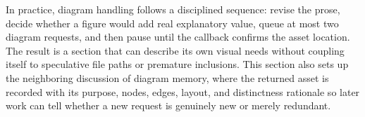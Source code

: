 \documentclass[11pt]{article}
\begin{document}
In practice, diagram handling follows a disciplined sequence: revise the prose, decide whether a figure would add real explanatory value, queue at most two diagram requests, and then pause until the callback confirms the asset location. The result is a section that can describe its own visual needs without coupling itself to speculative file paths or premature inclusions. This section also sets up the neighboring discussion of diagram memory, where the returned asset is recorded with its purpose, nodes, edges, layout, and distinctness rationale so later work can tell whether a new request is genuinely new or merely redundant.
\end{document}
